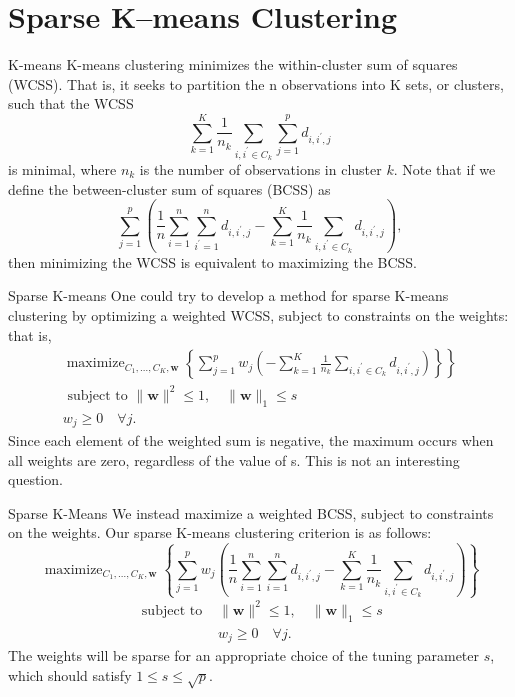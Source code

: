\documentclass[12pt]{beamer}
\begin{document}
\section{Sparse K–means Clustering}
\begin{frame}{K-means}
K-means clustering minimizes the within-cluster sum of
squares (WCSS). That is, it seeks to partition the n observations
into K sets, or clusters, such that the WCSS
$$
\sum_{k=1}^{K} \frac{1}{n_{k}} \sum_{i, i^{\prime} \in C_{k}} \sum_{j=1}^{p} d_{i, i^{\prime}, j}
$$
is minimal, where $n_k$ is the number of observations in cluster $k$.
Note that if we define the
between-cluster sum of squares (BCSS) as
$$
\sum_{j=1}^{p}\left(\frac{1}{n} \sum_{i=1}^{n} \sum_{i^{\prime}=1}^{n} d_{i, i^{\prime}, j}-\sum_{k=1}^{K} \frac{1}{n_{k}} \sum_{i, i^{\prime} \in C_{k}} d_{i, i^{\prime}, j}\right),
$$
then minimizing the WCSS is equivalent to maximizing the
BCSS.
\end{frame}

\begin{frame}{Sparse K-means}
One could try to develop a method for sparse K-means clustering
by optimizing a weighted WCSS, subject to constraints
on the weights: that is,
$$
\begin{array}{c}
\left.\operatorname{maximize}_{C_{1}, \ldots, C_{K}, \mathbf{w}}\left\{\sum_{j=1}^{p} w_{j}\left(-\sum_{k=1}^{K} \frac{1}{n_{k}} \sum_{i, i^{\prime} \in C_{k}} d_{i, i^{\prime}, j}\right)\right\}\right\} \\
\text { subject to }\|\mathbf{w}\|^{2} \leq 1, \quad\|\mathbf{w}\|_{1} \leq s \\
w_{j} \geq 0 \quad \forall j.
\end{array}
$$
Since each element of the
weighted sum is negative, the maximum occurs when all
weights are zero, regardless of the value of s. This is not an interesting question.
\end{frame}

\begin{frame}{Sparse K-Means}
We instead maximize a weighted BCSS,
subject to constraints on the weights. Our sparse K-means clustering
criterion is as follows:
$$
\operatorname{maximize}_{C_{1}, \ldots, C_{K}, \mathbf{w}}\left\{\sum_{j=1}^{p} w_{j}\left(\frac{1}{n} \sum_{i=1}^{n} \sum_{i=1}^{n} d_{i, i^{\prime}, j}-\sum_{k=1}^{K} \frac{1}{n_{k}} \sum_{i, i^{\prime} \in C_{k}} d_{i, i^{\prime}, j}\right)\right\}
$$
$$
\begin{array}{ll}
\text { subject to } & \|\mathbf{w}\|^{2} \leq 1, \quad\|\mathbf{w}\|_{1} \leq s \\
& w_{j} \geq 0 \quad \forall j.
\end{array}
$$
The weights will be sparse for an appropriate choice of the tuning
parameter $s$, which should satisfy $1\le s \le \sqrt{p}$.
\end{frame}
\end{document}
